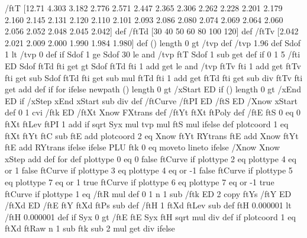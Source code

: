 {  %
  /ftT [12.71 4.303 3.182 2.776 2.571 2.447 2.365 2.306 2.262 2.228 2.201 2.179
        2.160 2.145 2.131 2.120 2.110 2.101 2.093 2.086 2.080 2.074 2.069 2.064
        2.060 2.056 2.052 2.048 2.045 2.042] def
  /ftTd [30 40 50 60 80 100 120] def
  /ftTv [2.042 2.021 2.009 2.000 1.990 1.984 1.980] def
  (\psk@tvp) length 0 gt { /tvp \psk@tvp\space def }{%
    /tvp 1.96 def
    Sdof 1 lt { /tvp 0 def } if
    Sdof 1 ge Sdof 30 le and { /tvp ftT Sdof 1 sub get def } if
    0 1 5 { /fti ED
      Sdof ftTd fti get gt Sdof ftTd fti 1 add get le and {
        /tvp ftTv fti 1 add get ftTv fti get sub
             Sdof ftTd fti get sub mul
             ftTd fti 1 add get ftTd fti get sub div
             ftTv fti get add def
      } if
    } for
  } ifelse
  newpath
  (\psk@xStart) length 0 gt             %
  { \psk@xStart\space /xStart ED } if
  (\psk@xEnd) length 0 gt             %
  { \psk@xEnd\space /xEnd ED } if
  /xStep xEnd xStart sub \psk@plotpoints\space div def
  /ftCurve { %
    /ftPI ED /ftS ED
    /Xnow xStart def
    0 1 \psk@plotpoints\space cvi { /ftk ED
      /ftXt Xnow FXtrans def
      /ftYt ftXt ftPoly def
      /ftE ftS 0 eq { 0 }{%
        ftXt ftLev ftPI { 1 add } if sqrt Syx mul tvp mul ftS mul } ifelse def
      plotcoord 1 eq { ftXt ftYt ftC sub ftE add }{%
        plotcoord 2 eq { Xnow ftYt RYtrans ftE add }{ Xnow ftYt ftE add RYtrans } ifelse
      } ifelse
      PLU ftk 0 eq { moveto } { lineto } ifelse
      /Xnow Xnow xStep add def
    } for } def
  plottype 0 eq { 0 false ftCurve } if
  plottype 2 eq plottype 4 eq or { 1 false ftCurve } if
  plottype 3 eq plottype 4 eq or { -1 false ftCurve } if
  plottype 5 eq plottype 7 eq or { 1 true ftCurve } if
  plottype 6 eq plottype 7 eq or { -1 true ftCurve } if
  plottype 1 eq {
    /ftR \psk@fontscale{} mul def
    0 1 n 1 sub { /ftk ED
      2 copy ftYs /ftY ED /ftXd ED
      /ftE ftY ftXd ftPs sub def
      /ftH 1 ftXd ftLev sub def
      ftH 0.000001 lt { /ftH 0.000001 def } if
      Syx 0 gt { /ftE ftE Syx ftH sqrt mul div def } if
      plotcoord 1 eq { ftXd }{%
        ftRaw n 1 sub ftk sub 2 mul get \pst@number\psxunit\space div } ifelse
}}}
